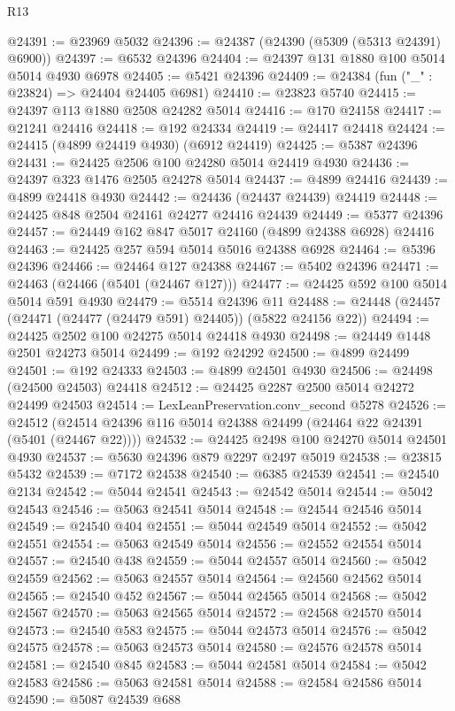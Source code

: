\begin{lexlean}{R13}
\begin{coremodule}
@24391 := @23969 @5032
@24396 := @24387 (@24390 (@5309 (@5313 @24391) @6900))
@24397 := @6532 @24396
@24404 := @24397 @131 @1880 @100 @5014 @5014 @4930 @6978
@24405 := @5421 @24396
@24409 := @24384 (fun ("_" : @23824) => @24404 @24405 @6981)
@24410 := @23823 @5740
@24415 := @24397 @113 @1880 @2508 @24282 @5014
@24416 := @170 @24158
@24417 := @21241 @24416
@24418 := @192 @24334
@24419 := @24417 @24418
@24424 := @24415 (@4899 @24419 @4930) (@6912 @24419)
@24425 := @5387 @24396
@24431 := @24425 @2506 @100 @24280 @5014 @24419 @4930
@24436 := @24397 @323 @1476 @2505 @24278 @5014
@24437 := @4899 @24416
@24439 := @4899 @24418 @4930
@24442 := @24436 (@24437 @24439) @24419
@24448 := @24425 @848 @2504 @24161 @24277 @24416 @24439
@24449 := @5377 @24396
@24457 := @24449 @162 @847 @5017 @24160 (@4899 @24388 @6928) @24416
@24463 := @24425 @257 @594 @5014 @5016 @24388 @6928
@24464 := @5396 @24396
@24466 := @24464 @127 @24388
@24467 := @5402 @24396
@24471 := @24463 (@24466 (@5401 (@24467 @127)))
@24477 := @24425 @592 @100 @5014 @5014 @591 @4930
@24479 := @5514 @24396 @11
@24488 := @24448 (@24457 (@24471 (@24477 (@24479 @591) @24405)) (@5822 @24156 @22))
@24494 := @24425 @2502 @100 @24275 @5014 @24418 @4930
@24498 := @24449 @1448 @2501 @24273 @5014
@24499 := @192 @24292
@24500 := @4899 @24499
@24501 := @192 @24333
@24503 := @4899 @24501 @4930
@24506 := @24498 (@24500 @24503) @24418
@24512 := @24425 @2287 @2500 @5014 @24272 @24499 @24503
@24514 := LexLeanPreservation.conv_second @5278
@24526 := @24512 (@24514 @24396 @116 @5014 @24388 @24499 (@24464 @22 @24391 (@5401 (@24467 @22))))
@24532 := @24425 @2498 @100 @24270 @5014 @24501 @4930
@24537 := @5630 @24396 @879 @2297 @2497 @5019
@24538 := @23815 @5432
@24539 := @7172 @24538
@24540 := @6385 @24539
@24541 := @24540 @2134
@24542 := @5044 @24541
@24543 := @24542 @5014
@24544 := @5042 @24543
@24546 := @5063 @24541 @5014
@24548 := @24544 @24546 @5014
@24549 := @24540 @404
@24551 := @5044 @24549 @5014
@24552 := @5042 @24551
@24554 := @5063 @24549 @5014
@24556 := @24552 @24554 @5014
@24557 := @24540 @438
@24559 := @5044 @24557 @5014
@24560 := @5042 @24559
@24562 := @5063 @24557 @5014
@24564 := @24560 @24562 @5014
@24565 := @24540 @452
@24567 := @5044 @24565 @5014
@24568 := @5042 @24567
@24570 := @5063 @24565 @5014
@24572 := @24568 @24570 @5014
@24573 := @24540 @583
@24575 := @5044 @24573 @5014
@24576 := @5042 @24575
@24578 := @5063 @24573 @5014
@24580 := @24576 @24578 @5014
@24581 := @24540 @845
@24583 := @5044 @24581 @5014
@24584 := @5042 @24583
@24586 := @5063 @24581 @5014
@24588 := @24584 @24586 @5014
@24590 := @5087 @24539 @688

\end{coremodule}
\end{lexlean}
